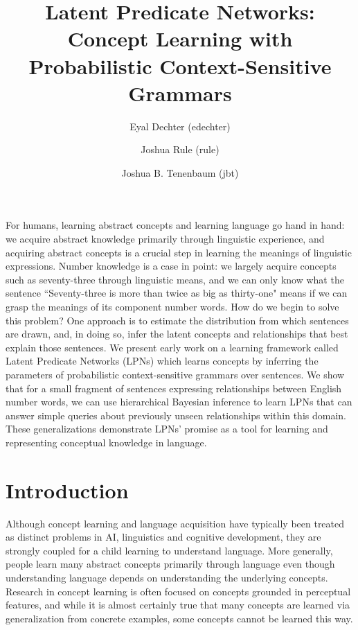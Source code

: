 \documentclass[10pt, twocolumn]{article}
\title{Latent Predicate Networks: Concept Learning with Probabilistic Context-Sensitive Grammars}
\author{Eyal Dechter (edechter)}
\author{Joshua Rule (rule)}
\author{Joshua B. Tenenbaum (jbt)}
\affil{Department of Brain and Cognitive Sciences, MIT (mit.edu)}
\date{}
\begin{document}
\vspace{-10cm}
\maketitle

\vspace{-6em}


{\small For humans, learning abstract concepts and learning language
  go hand in hand: we acquire abstract knowledge primarily through
  linguistic experience, and acquiring abstract concepts is a crucial
  step in learning the meanings of linguistic expressions. Number
  knowledge is a case in point: we largely acquire concepts such as
  seventy-three through linguistic means, and we can only know what
  the sentence ``Seventy-three is more than twice as big as
  thirty-one" means if we can grasp the meanings of its component
  number words. How do we begin to solve this problem? One approach is
  to estimate the distribution from which sentences are drawn, and, in
  doing so, infer the latent concepts and relationships that best
  explain those sentences. We present early work on a learning
  framework called Latent Predicate Networks (LPNs) which learns
  concepts by inferring the parameters of probabilistic
  context-sensitive grammars over sentences.  We show that for a small
  fragment of sentences expressing relationships between English
  number words, we can use hierarchical Bayesian inference to learn
  LPNs that can answer simple queries about previously unseen
  relationships within this domain. These generalizations demonstrate
  LPNs' promise as a tool for learning and representing conceptual
  knowledge in language.}

\section{Introduction}

Although concept learning and language acquisition have typically been
treated as distinct problems in AI, linguistics and cognitive
development, they are strongly coupled for a child learning to
understand language. More generally, people learn many abstract
concepts primarily through language even though understanding language
depends on understanding the underlying concepts. Research in concept
learning is often focused on concepts grounded in perceptual features,
and while it is almost certainly true that many concepts are learned
via generalization from concrete examples, some concepts cannot be
learned this way.
\end{document}
